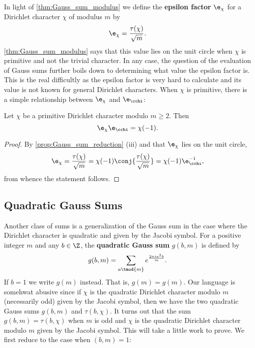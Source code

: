         In light of \cref{thm:Gauss_sum_modulus} we define the \textbf{epsilon factor} $\e_{\chi}$ for a Dirichlet character $\chi$ of modulus $m$ by
        \[
          \e_{\chi} = \frac{\tau(\chi)}{\sqrt{m}}.
        \]
        \cref{thm:Gauss_sum_modulus} says that this value lies on the unit circle when $\chi$ is primitive and not the trivial character. In any case, the question of the evaluation of Gauss sums further boils down to determining what value the epsilon factor is. This is the real difficultly as the epsilon factor is very hard to calculate and its value is not known for general Dirichlet characters. When $\chi$ is primitive, there is a simple relationship between $\e_{\chi}$ and $\e_{\cchi}$:

        \begin{proposition}\label{prop:epsilon_factor_relationship}
          Let $\chi$ be a primitive Dirichlet character modulo $m \ge 2$. Then
          \[
            \e_{\chi}\e_{\cchi} = \chi(-1).
          \]
        \end{proposition}
        \begin{proof}
          By \cref{prop:Gauss_sum_reduction} (iii) and that $\e_{\chi}$ lies on the unit circle,
          \[
            \e_{\chi} = \frac{\tau(\chi)}{\sqrt{m}} = \chi(-1)\conj{\frac{\tau(\chi)}{\sqrt{m}}} = \chi(-1)\e_{\cchi}^{-1},
          \]
          from whence the statement follows.
        \end{proof}
      \subsection*{Quadratic Gauss Sums}
        Another class of sums is a generalization of the Gauss sum in the case where the Dirichlet character is quadratic and given by the Jacobi symbol. For a positive integer $m$ and any $b \in \Z$, the \textbf{quadratic Gauss sum} $g(b,m)$ is defined by
        \[
          g(b,m) = \sum_{a \tmod{m}}e^{\frac{2\pi ia^{2}b}{m}}.
        \]
        If $b = 1$ we write $g(m)$ instead. That is, $g(m) = g(m)$. Our language is somehwat abusive since if $\chi$ is the quadratic Dirichlet character modulo $m$ (necessarily odd) given by the Jacobi symbol, then we have the two quadratic Gauss sums $g(b,m)$ and $\tau(b,\chi)$. It turns out that the sum $g(b,m) = \tau(b,\chi)$ when $m$ is odd and $\chi$ is the quadratic Dirichlet character modulo $m$ given by the Jacobi symbol. This will take a little work to prove. We first reduce to the case when $(b,m) = 1$:

